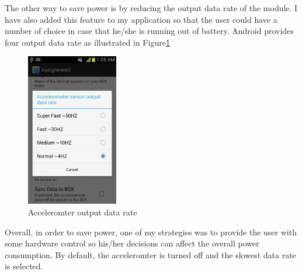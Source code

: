 \documentclass[conference]{IEEEtran}
\begin{document}
The  other way to save power is by reducing the output data rate of the module. I have also added this feature to my application so that the user could have a number of choice in case that he/she is running out of battery. Android provides four output data rate as illustrated in Figure\ref{DisEnAccel}
\begin{figure}
\centering
\includegraphics[width=4cm]{DataRate.jpg}
\caption{\scriptsize  Acceleromter output data rate}
\label{DisEnAccel}
\end{figure}
Overall, in order to save power, one of my strategies was to provide the user with some hardware control so his/her decisions can affect the overall power consumption. By default, the acceleromter is turned off and the slowest data rate is selected.
\end{document}
